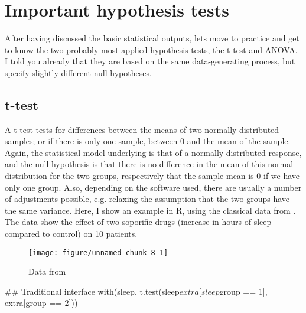 \documentclass[a4paper,twoside]{tufte-book}\usepackage[]{graphicx}\usepackage[]{color}
\makeatletter
\def\maxwidth{ %
  \ifdim\Gin@nat@width>\linewidth
    \linewidth
  \else
    \Gin@nat@width
  \fi
}
\makeatother
\begin{document}
\section{Important hypothesis tests}

After having discussed the basic statistical outputs, lets move to practice and get to know the two probably most applied hypothesis tests, the t-test and ANOVA. I told you already that they are based on the same data-generating process, but specify slightly different null-hypotheses. 

\subsection{t-test}

A t-test tests for differences between the means of two normally distributed samples; or if there is only one sample, between 0 and the mean of the sample. Again, the statistical model underlying is that of a normally distributed response, and the null hypothesis is that there is no difference in the mean of this normal distribution for the two groups, respectively that the sample mean is 0 if we have only one group. Also, depending on the software used, there are usually a number of adjustments possible, e.g. relaxing the assumption that the two groups have the same variance. Here, I show an example in R, using the classical data from \citet{Student-probableerrormean-1908}. The data show the effect of two soporific drugs (increase in hours of sleep compared to control) on 10 patients. 

\begin{figure}[htbp]
\begin{center}
\begin{Schunk}

\texttt{[image: figure/unnamed-chunk-8-1]} \end{Schunk}
\caption{Data from \citet{Student-probableerrormean-1908}}
\label{fig: Student Sleep Data}
\end{center}
\end{figure}

\begin{Schunk}
\begin{Sinput}
## Traditional interface
with(sleep, t.test(sleep$extra[sleep$group == 1], extra[group == 2]))
\end{Sinput}
\end{Schunk}
\end{document}
